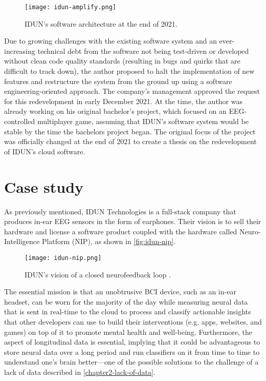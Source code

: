 \begin{figure}[!ht]
  \centering
  \texttt{[image: idun-amplify.png]}
  \caption{IDUN’s software architecture at the end of 2021.}
  \label{fig:idun-amplify}
\end{figure}

Due to growing challenges with the existing software system and an ever-increasing technical debt from the software not being test-driven or developed without clean code quality standards (resulting in bugs and quirks that are difficult to track down), the author proposed to halt the implementation of new features and restructure the system from the ground up using a software engineering-oriented approach. The company’s management approved the request for this redevelopment in early December 2021. At the time, the author was already working on his original bachelor’s project, which focused on an EEG-controlled multiplayer game, assuming that IDUN’s software system would be stable by the time the bachelors project began. The original focus of the project was officially changed at the end of 2021 to create a thesis on the redevelopment of IDUN’s cloud software.

\section{Case study}
\label{chapter3-case-study}

As previously mentioned, IDUN Technologies is a full-stack company that produces in-ear EEG sensors in the form of earphones. Their vision is to sell their hardware and license a software product coupled with the hardware called Neuro-Intelligence Platform (NIP), as shown in \autoref{fig:idun-nip}.

\begin{figure}[!ht]
  \centering
  \texttt{[image: idun-nip.png]}
  \caption[IDUN’s vision of a closed neurofeedback loop ]{IDUN’s vision of a closed neurofeedback loop \citep{idun_guardian_nodate}.}
  \label{fig:idun-nip}
\end{figure}

The essential mission is that an unobtrusive BCI device, such as an in-ear headset, can be worn for the majority of the day while measuring neural data that is sent in real-time to the cloud to process and classify actionable insights that other developers can use to build their interventions (e.g. apps, websites, and games) on top of it to promote mental health and well-being. Furthermore, the aspect of longitudinal data is essential, implying that it could be advantageous to store neural data over a long period and run classifiers on it from time to time to understand one’s brain better—one of the possible solutions to the challenge of a lack of data described in \autoref{chapter2-lack-of-data}.

